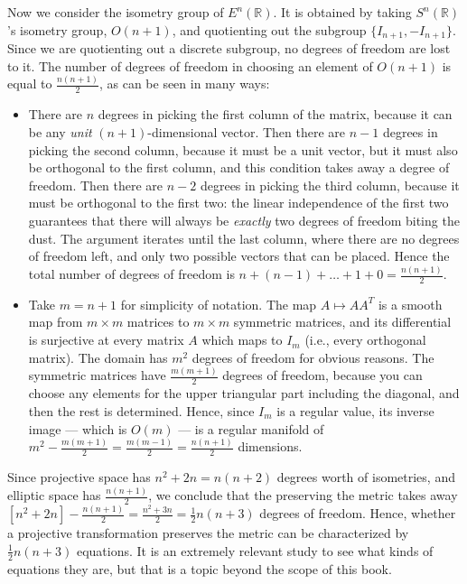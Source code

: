 \documentclass[leqno]{book}
\begin{document}
Now we consider the isometry group of $E^n(\mathbb R)$.  It is obtained by taking $S^n(\mathbb R)$'s isometry group, $O(n+1)$, and quotienting out the subgroup $\{I_{n+1},-I_{n+1}\}$.  Since we are quotienting out a discrete subgroup, no degrees of freedom are lost to it.  The number of degrees of freedom in choosing an element of $O(n+1)$ is equal to $\frac{n(n+1)}2$, as can be seen in many ways:
\begin{itemize}
\item There are $n$ degrees in picking the first column of the matrix, because it can be any \emph{unit} $(n+1)$-dimensional vector.  Then there are $n-1$ degrees in picking the second column, because it must be a unit vector, but it must also be orthogonal to the first column, and this condition takes away a degree of freedom.  Then there are $n-2$ degrees in picking the third column, because it must be orthogonal to the first two: the linear independence of the first two guarantees that there will always be \emph{exactly} two degrees of freedom biting the dust.  The argument iterates until the last column, where there are no degrees of freedom left, and only two possible vectors that can be placed.  Hence the total number of degrees of freedom is $n+(n-1)+\dots+1+0=\frac{n(n+1)}2$.

\item Take $m=n+1$ for simplicity of notation.  The map $A\mapsto AA^T$ is a smooth map from $m\times m$ matrices to $m\times m$ symmetric matrices, and its differential is surjective at every matrix $A$ which maps to $I_m$ (i.e., every orthogonal matrix).  The domain has $m^2$ degrees of freedom for obvious reasons.  The symmetric matrices have $\frac{m(m+1)}2$ degrees of freedom, because you can choose any elements for the upper triangular part including the diagonal, and then the rest is determined.  Hence, since $I_m$ is a regular value, its inverse image \---- which is $O(m)$ \---- is a regular manifold of $m^2-\frac{m(m+1)}2=\frac{m(m-1)}2=\frac{n(n+1)}2$ dimensions.
\end{itemize}
Since projective space has $n^2+2n=n(n+2)$ degrees worth of isometries, and elliptic space has $\frac{n(n+1)}2$, we conclude that the preserving the metric takes away $[n^2+2n]-\frac{n(n+1)}2=\frac{n^2+3n}2=\frac 12n(n+3)$ degrees of freedom.  Hence, whether a projective transformation preserves the metric can be characterized by $\frac 12n(n+3)$ equations.  It is an extremely relevant study to see what kinds of equations they are, but that is a topic beyond the scope of this book.
\end{document}
